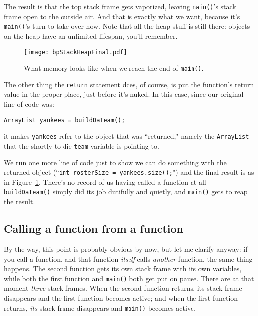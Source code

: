 The result is that the top stack frame gets vaporized, leaving
\texttt{main()}'s stack frame open to the outside air. And that is exactly
what we want, because it's \texttt{main()}'s turn to take over now. Note that
all the heap stuff is still there: objects on the heap have an unlimited
lifespan, you'll remember.

\begin{figure}[ht]   %
\centering
\texttt{[image: bpStackHeapFinal.pdf]}
\caption{What memory looks like when we reach the end of \texttt{main()}.}
\label{fig:bpStackHeapFinal}
\end{figure}

The other thing the \texttt{return} statement does, of course, is put the
function's return value in the proper place, just before it's nuked. In this
case, since our original line of code was:

\begin{Verbatim}[fontsize=\small,samepage=true]
        ArrayList yankees = buildDaTeam();
\end{Verbatim}

it makes \texttt{yankees} refer to the object that was ``returned," namely the
\texttt{ArrayList} that the shortly-to-die \texttt{team} variable is pointing
to.

We run one more line of code just to show we can do something with the
returned object (``\texttt{int rosterSize = yankees.size();}") and the final
result is as in Figure~\ref{fig:bpStackHeapFinal}. There's no record of us
having called a function at all -- \texttt{buildDaTeam()} simply did its job
dutifully and quietly, and \texttt{main()} gets to reap the result.

\subsection{Calling a function from a function}

By the way, this point is probably obvious by now, but let me clarify anyway:
if you call a function, and that function \textit{itself} calls
\textit{another} function, the same thing happens. The second function gets
its own stack frame with its own variables, while both the first function and
\texttt{main()} both get put on pause. There are at that moment \textit{three}
stack frames. When the second function returns, its stack frame disappears and
the first function becomes active; and when the first function returns,
\textit{its} stack frame disappears and \texttt{main()} becomes active.

